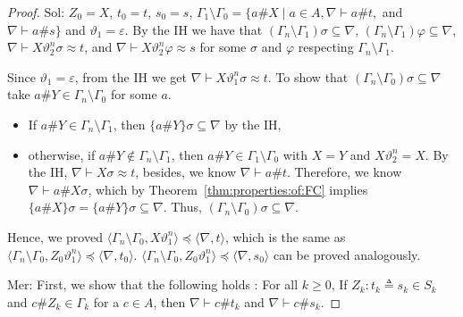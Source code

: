 \documentclass{llncs}
\newcommand{\np}[2]{\langle #1, \allowbreak #2\rangle}
\newcommand{\Atoms}{A}
\begin{document}
\begin{proof}
{\sf Sol:} $Z_0=X$, $t_0=t$, $s_0=s$, $\Gamma_1\setminus
\Gamma_0=\{a\#X \mid a\in \Atoms, \nabla \vdash a\#t,$ and $\nabla
\vdash a\#s \}$ and $\vartheta_1=\varepsilon$.  By the IH we have that
$(\Gamma_n\setminus \Gamma_1)\sigma \subseteq \nabla$,
$(\Gamma_n\setminus \Gamma_1)\varphi \subseteq \nabla$, $\nabla \vdash
X\vartheta_2^n\sigma \approx t$, and $\nabla \vdash
X\vartheta_2^n\varphi \approx s$ for some $\sigma$ and $\varphi$
respecting $\Gamma_n\setminus \Gamma_1$.

Since $\vartheta_1=\varepsilon$, from the IH we get $\nabla \vdash
X\vartheta_1^n\sigma \approx t$. To show that $(\Gamma_n\setminus
\Gamma_0)\sigma \subseteq \nabla$ take $a\# Y\in \Gamma_n\setminus
\Gamma_0$ for some $a$.

\begin{itemize}
\item  If $a\# Y\in\Gamma_n\setminus \Gamma_1$, then $\{a\# Y\}\sigma \subseteq \nabla$ by the IH,
\item otherwise, if $a\# Y\notin \Gamma_n\setminus
\Gamma_1$, then  $a\# Y\in \Gamma_1\setminus \Gamma_0$
with $X=Y$ and $X\vartheta_2^n =X$. By the IH, $\nabla
\vdash X\sigma \approx t$, besides, we know $\nabla \vdash
a\#t$. Therefore, we know $\nabla \vdash a\#X\sigma$, which by
Theorem~\ref{thm:properties:of:FC} implies $\{a\# X\}\sigma=\{a\#
Y\}\sigma \subseteq \nabla$. Thus, $(\Gamma_n\setminus \Gamma_0)\sigma
\subseteq \nabla$.
\end{itemize}

 Hence, we proved $\np{\Gamma_n\setminus
   \Gamma_0}{X\vartheta_1^n}\preceq \np{\nabla}{t}$, which is the same
 as $\np{\Gamma_n\setminus \Gamma_0}{Z_0\vartheta_1^n}\preceq
 \np{\nabla}{t_0}$.  $\np{\Gamma_n\setminus
   \Gamma_0}{Z_0\vartheta_1^n}\preceq \np{\nabla}{s_0}$ can be proved
 analogously. \vspace{0.3cm}




{\sf Mer:} First, we show that the following holds : For all $k\ge 0$, If $Z_k:t_k\triangleq s_k \in S_k$ and $c\#Z_k\in \Gamma_k$ for a $c\in A$, then $\nabla \vdash c\# t_k$ and $\nabla \vdash c\# s_k$. 


\end{proof}
\end{document}
